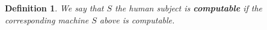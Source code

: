 \documentclass{amsart}  %
\numberwithin{equation}{section}
\newtheorem{definition}[equation]{Definition}
\theoremstyle{definition}
\theoremstyle{remark}
\begin{document}
{%
\begin{definition} We say that $S$ the human subject  is \textbf{\emph{computable}} if the corresponding machine $S$ above is computable.
\end{definition}
}
\end{document}
